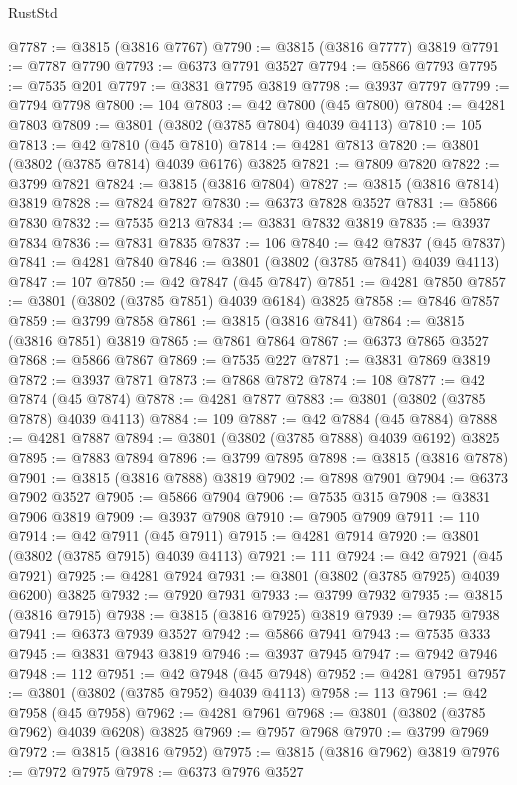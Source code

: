 \begin{lexlean}{RustStd}
\begin{coremodule}
@7787 := @3815 (@3816 @7767)
@7790 := @3815 (@3816 @7777) @3819
@7791 := @7787 @7790
@7793 := @6373 @7791 @3527
@7794 := @5866 @7793
@7795 := @7535 @201
@7797 := @3831 @7795 @3819
@7798 := @3937 @7797
@7799 := @7794 @7798
@7800 := 104
@7803 := @42 @7800 (@45 @7800)
@7804 := @4281 @7803
@7809 := @3801 (@3802 (@3785 @7804) @4039 @4113)
@7810 := 105
@7813 := @42 @7810 (@45 @7810)
@7814 := @4281 @7813
@7820 := @3801 (@3802 (@3785 @7814) @4039 @6176) @3825
@7821 := @7809 @7820
@7822 := @3799 @7821
@7824 := @3815 (@3816 @7804)
@7827 := @3815 (@3816 @7814) @3819
@7828 := @7824 @7827
@7830 := @6373 @7828 @3527
@7831 := @5866 @7830
@7832 := @7535 @213
@7834 := @3831 @7832 @3819
@7835 := @3937 @7834
@7836 := @7831 @7835
@7837 := 106
@7840 := @42 @7837 (@45 @7837)
@7841 := @4281 @7840
@7846 := @3801 (@3802 (@3785 @7841) @4039 @4113)
@7847 := 107
@7850 := @42 @7847 (@45 @7847)
@7851 := @4281 @7850
@7857 := @3801 (@3802 (@3785 @7851) @4039 @6184) @3825
@7858 := @7846 @7857
@7859 := @3799 @7858
@7861 := @3815 (@3816 @7841)
@7864 := @3815 (@3816 @7851) @3819
@7865 := @7861 @7864
@7867 := @6373 @7865 @3527
@7868 := @5866 @7867
@7869 := @7535 @227
@7871 := @3831 @7869 @3819
@7872 := @3937 @7871
@7873 := @7868 @7872
@7874 := 108
@7877 := @42 @7874 (@45 @7874)
@7878 := @4281 @7877
@7883 := @3801 (@3802 (@3785 @7878) @4039 @4113)
@7884 := 109
@7887 := @42 @7884 (@45 @7884)
@7888 := @4281 @7887
@7894 := @3801 (@3802 (@3785 @7888) @4039 @6192) @3825
@7895 := @7883 @7894
@7896 := @3799 @7895
@7898 := @3815 (@3816 @7878)
@7901 := @3815 (@3816 @7888) @3819
@7902 := @7898 @7901
@7904 := @6373 @7902 @3527
@7905 := @5866 @7904
@7906 := @7535 @315
@7908 := @3831 @7906 @3819
@7909 := @3937 @7908
@7910 := @7905 @7909
@7911 := 110
@7914 := @42 @7911 (@45 @7911)
@7915 := @4281 @7914
@7920 := @3801 (@3802 (@3785 @7915) @4039 @4113)
@7921 := 111
@7924 := @42 @7921 (@45 @7921)
@7925 := @4281 @7924
@7931 := @3801 (@3802 (@3785 @7925) @4039 @6200) @3825
@7932 := @7920 @7931
@7933 := @3799 @7932
@7935 := @3815 (@3816 @7915)
@7938 := @3815 (@3816 @7925) @3819
@7939 := @7935 @7938
@7941 := @6373 @7939 @3527
@7942 := @5866 @7941
@7943 := @7535 @333
@7945 := @3831 @7943 @3819
@7946 := @3937 @7945
@7947 := @7942 @7946
@7948 := 112
@7951 := @42 @7948 (@45 @7948)
@7952 := @4281 @7951
@7957 := @3801 (@3802 (@3785 @7952) @4039 @4113)
@7958 := 113
@7961 := @42 @7958 (@45 @7958)
@7962 := @4281 @7961
@7968 := @3801 (@3802 (@3785 @7962) @4039 @6208) @3825
@7969 := @7957 @7968
@7970 := @3799 @7969
@7972 := @3815 (@3816 @7952)
@7975 := @3815 (@3816 @7962) @3819
@7976 := @7972 @7975
@7978 := @6373 @7976 @3527

\end{coremodule}
\end{lexlean}
